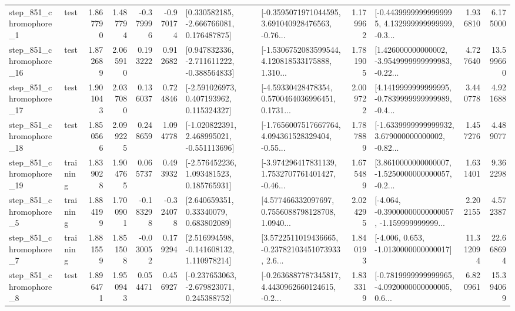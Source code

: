 \begin{tabular}{llrrrrllrlrr}
   step\_851\_chromophore\_1 &      test &      1.867790 &    1.487794 &     -0.379996 & -0.970174 &    [0.330582185, -2.666766081, 0.176487875] &  [-0.3595071971044595, 3.691040928476563, -0.76... &       1.179962 &  [-0.44399999999999995, 4.132999999999999, -0.3... &            1.936810 &          6.175000 \\
  step\_851\_chromophore\_16 &      test &      1.872689 &    2.065910 &      0.193222 &  0.912682 &   [0.947832336, -2.711611222, -0.388564833] &  [-1.5306752083599544, 4.120818533175888, 1.310... &       1.781905 &  [1.426000000000002, -3.9549999999999983, -0.22... &            4.727640 &         13.599660 \\
  step\_851\_chromophore\_17 &      test &      1.901043 &    2.037080 &      0.136037 &  0.724846 &    [-2.591026973, 0.407193962, 0.115324327] &  [-4.59330428478354, 0.5700464036996451, 0.1731... &       2.009722 &  [4.1419999999999995, -0.7839999999999989, -0.4... &            3.440778 &          4.921688 \\
  step\_851\_chromophore\_18 &      test &      1.850566 &    2.099225 &      0.248659 &  1.094778 &   [-1.020822391, 2.468995021, -0.551113696] &  [-1.7656007517667764, 4.094361528329404, -0.55... &       1.787889 &  [-1.6339999999999932, 3.679000000000002, -0.82... &            1.457276 &          4.489077 \\
  step\_851\_chromophore\_19 &  training &      1.839028 &    1.904765 &      0.065737 &  0.493932 &    [-2.576452236, 1.093481523, 0.185765931] &  [-3.974296417831139, 1.7532707761401427, -0.46... &       1.675489 &  [3.8610000000000007, -1.5250000000000057, -0.2... &            1.631401 &          9.362298 \\
   step\_851\_chromophore\_5 &  training &      1.884199 &    1.700901 &     -0.183298 & -0.324078 &      [2.640659351, 0.33340079, 0.683802089] &  [4.577466332097697, 0.7556088798128708, 1.0940... &       2.024295 &  [-4.064, -0.39000000000000057, -1.159999999999... &            2.202155 &          4.572387 \\
   step\_851\_chromophore\_7 &  training &      1.881559 &    1.851508 &     -0.030052 &  0.179294 &    [2.516994598, -0.141608132, 1.110978214] &  [3.5722511019436665, -0.23782103451073933, 2.6... &       1.840193 &               [-4.006, 0.653, -1.0130000000000017] &           11.312094 &         22.668694 \\
   step\_851\_chromophore\_8 &      test &      1.896471 &    1.950943 &      0.054471 &  0.456927 &   [-0.237653063, -2.679823071, 0.245388752] &  [-0.2636887787345817, 4.4430962660124615, -0.2... &       1.833319 &  [-0.7819999999999965, -4.0920000000000005, 0.6... &            6.820961 &         15.394069 \\

\end{tabular}

